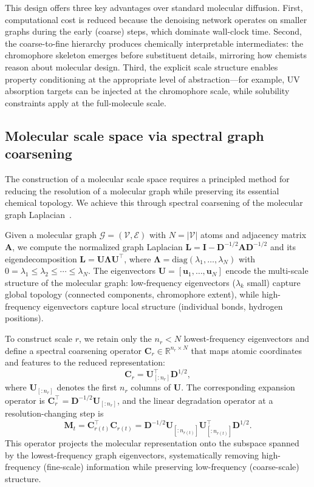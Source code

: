 \documentclass[11pt]{article}
\newcommand{\mM}{\mathbf{M}}
\newcommand{\mL}{\mathbf{L}}
\newcommand{\mI}{\mathbf{I}}
\newcommand{\mC}{\mathbf{C}}
\newcommand{\mU}{\mathbf{U}}
\newcommand{\mLambda}{\boldsymbol{\Lambda}}
\newcommand{\R}{\mathbb{R}}
\begin{document}
This design offers three key advantages over standard molecular diffusion. First, computational cost is reduced because the denoising network operates on smaller graphs during the early (coarse) steps, which dominate wall-clock time. Second, the coarse-to-fine hierarchy produces chemically interpretable intermediates: the chromophore skeleton emerges before substituent details, mirroring how chemists reason about molecular design. Third, the explicit scale structure enables property conditioning at the appropriate level of abstraction---for example, UV absorption targets can be injected at the chromophore scale, while solubility constraints apply at the full-molecule scale.


\subsection*{Molecular scale space via spectral graph coarsening}

The construction of a molecular scale space requires a principled method for reducing the resolution of a molecular graph while preserving its essential chemical topology. We achieve this through spectral coarsening of the molecular graph Laplacian~\cite{chung1997spectral, vonluxburg2007spectral}.

Given a molecular graph $\mathcal{G} = (\mathcal{V}, \mathcal{E})$ with $N = |\mathcal{V}|$ atoms and adjacency matrix $\mathbf{A}$, we compute the normalized graph Laplacian $\mL = \mI - \mathbf{D}^{-1/2}\mathbf{A}\mathbf{D}^{-1/2}$ and its eigendecomposition $\mL = \mU \mLambda \mU^\top$, where $\mLambda = \text{diag}(\lambda_1, \ldots, \lambda_N)$ with $0 = \lambda_1 \le \lambda_2 \le \cdots \le \lambda_N$. The eigenvectors $\mU = [\mathbf{u}_1, \ldots, \mathbf{u}_N]$ encode the multi-scale structure of the molecular graph: low-frequency eigenvectors ($\lambda_k$ small) capture global topology (connected components, chromophore extent), while high-frequency eigenvectors capture local structure (individual bonds, hydrogen positions).

To construct scale $r$, we retain only the $n_r < N$ lowest-frequency eigenvectors and define a spectral coarsening operator $\mC_r \in \R^{n_r \times N}$ that maps atomic coordinates and features to the reduced representation:
\begin{equation}
\label{eq:coarsen}
    \mC_r = \mU_{[:n_r]}^\top \mathbf{D}^{1/2},
\end{equation}
where $\mU_{[:n_r]}$ denotes the first $n_r$ columns of $\mU$. The corresponding expansion operator is $\mC_r^\top = \mathbf{D}^{-1/2} \mU_{[:n_r]}$, and the linear degradation operator at a resolution-changing step is
\begin{equation}
\label{eq:degradation}
    \mM_t = \mC_{r(t)}^\top \mC_{r(t)} = \mathbf{D}^{-1/2}\mU_{[:n_{r(t)}]}\mU_{[:n_{r(t)}]}^\top\mathbf{D}^{1/2}.
\end{equation}
This operator projects the molecular representation onto the subspace spanned by the lowest-frequency graph eigenvectors, systematically removing high-frequency (fine-scale) information while preserving low-frequency (coarse-scale) structure.
\end{document}
